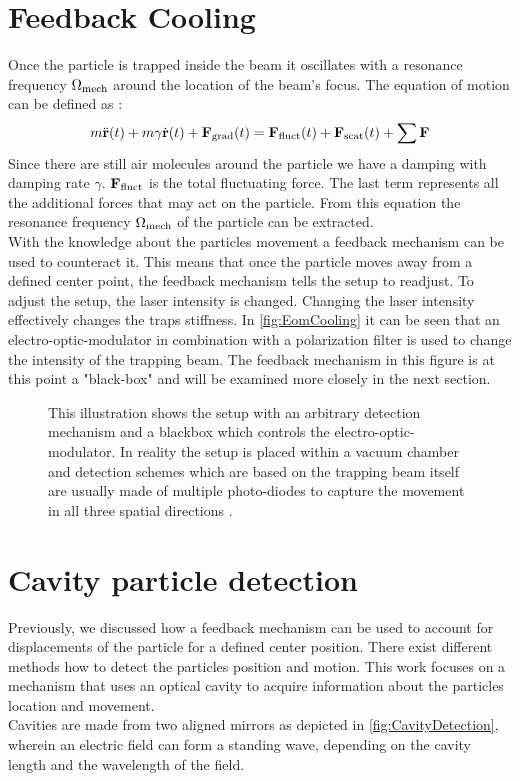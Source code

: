 \section{Feedback Cooling}
Once the particle is trapped inside the beam it oscillates with a resonance frequency $\de{\Omega}{mech}$ around the location of the beam's focus. The equation of motion can be defined as \cite[p.~24]{hebestreit2017thermal}:
\begin{equation}
	m\ddot{\vc{r}}(t)+m\gamma\dot{\vc{r}}(t)+\field{F}{grad}(t)=\field{F}{fluct}(t)+\field{F}{scat}(t)+\sum\limits\vc{F}
\end{equation}
Since there are still air molecules around the particle we have a damping with damping rate $\gamma$. $\field{F}{fluct}$ is the total fluctuating force. The last term represents all the additional forces that may act on the particle. From this equation the resonance frequency $\de{\Omega}{mech}$ of the particle can be extracted.\\
With the knowledge about the particles movement a feedback mechanism can be used to counteract it. This means that once the particle moves away from a defined center point, the feedback mechanism tells the setup to readjust. To adjust the setup, the laser intensity is changed. Changing the laser intensity effectively changes the traps stiffness. In \autoref{fig:EomCooling} it can be seen that an electro-optic-modulator in combination with a polarization filter is used to change the intensity of the trapping beam. The feedback mechanism in this figure is at this point a "black-box" and will be examined more closely in the next section.
\begin{figure}[H]
    
    \caption{This illustration shows the setup with an arbitrary detection mechanism and a blackbox which controls the electro-optic-modulator. In reality the setup is placed within a vacuum chamber and detection schemes which are based on the trapping beam itself are usually made of multiple photo-diodes to capture the movement in all three spatial directions \cite[p.~43]{hebestreit2017thermal}.}
    \label{fig:EomCooling}
\end{figure}

\section{Cavity particle detection}\label{ChapCavityDetection}
Previously, we discussed how a feedback mechanism can be used to account for displacements of the particle for a defined center position. There exist different methods how to detect the particles position and motion. This work focuses on a mechanism that uses an optical cavity to acquire information about the particles location and movement.\\
Cavities are made from two aligned mirrors as depicted in \autoref{fig:CavityDetection}, wherein an electric field can form a standing wave, depending on the cavity length and the wavelength of the field.


